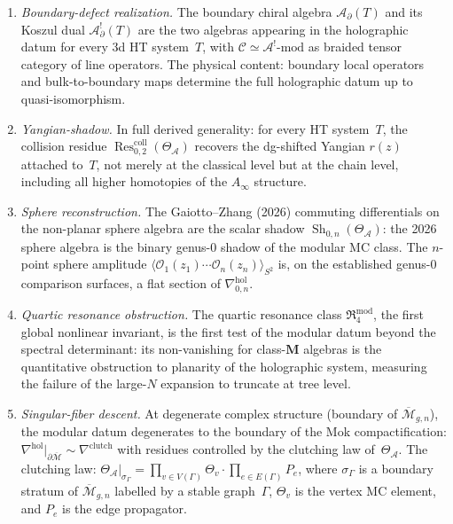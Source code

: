 \documentclass[11pt]{report}
\theoremstyle{definition}
\theoremstyle{remark}
\providecommand{\cA}{\mathcal{A}}
\providecommand{\cC}{\mathcal{C}}
\providecommand{\cM}{\mathcal{M}}
\providecommand{\cO}{\mathcal{O}}
\numberwithin{equation}{section}
\begin{document}
\begin{enumerate}[label=(\roman*)]
\item \emph{Boundary-defect realization.}
 The boundary chiral algebra $\cA_\partial(T)$ and its Koszul
 dual $\cA^!_\partial(T)$ are the two algebras appearing in the
 holographic datum for every 3d HT system~$T$, with
 $\cC\simeq\cA^!\text{-mod}$ as braided tensor category of line
 operators. The physical content: boundary local operators and
 bulk-to-boundary maps determine the full holographic datum up
 to quasi-isomorphism.

\item \emph{Yangian-shadow.}
 In full derived generality: for every HT system~$T$, the
 collision residue
 $\operatorname{Res}^{\mathrm{coll}}_{0,2}(\Theta_\cA)$ recovers
 the dg-shifted Yangian $r(z)$ attached to~$T$, not merely at
 the classical level but at the chain level, including all
 higher homotopies of the $A_\infty$ structure.

\item \emph{Sphere reconstruction.}
 The Gaiotto--Zhang (2026) commuting differentials on the
 non-planar sphere algebra are the scalar shadow
 $\operatorname{Sh}_{0,n}(\Theta_\cA)$: the 2026 sphere algebra
 is the binary genus-$0$ shadow of the modular MC class. The
 $n$-point sphere amplitude
 $\langle\cO_1(z_1)\cdots\cO_n(z_n)\rangle_{S^2}$ is, on the
 established genus-$0$ comparison surfaces, a flat section of
 $\nabla^{\mathrm{hol}}_{0,n}$.

\item \emph{Quartic resonance obstruction.}
 The quartic resonance class $\mathfrak R^{\mathrm{mod}}_4$, the
 first global nonlinear invariant, is
 the first test of the modular datum beyond the spectral
 determinant: its non-vanishing for class-$\mathbf{M}$ algebras
 is the quantitative obstruction to planarity of the holographic
 system, measuring the failure of the large-$N$ expansion to
 truncate at tree level.

\item \emph{Singular-fiber descent.}
 At degenerate complex structure (boundary of
 $\overline{\cM}_{g,n}$), the modular datum degenerates to the
 boundary of the Mok compactification:
 $\nabla^{\mathrm{hol}}|_{\partial\overline{\cM}}\sim
 \nabla^{\mathrm{clutch}}$ with residues controlled by the
 clutching law of~$\Theta_\cA$. The clutching law:
 $\Theta_\cA|_{\sigma_\Gamma}=\prod_{v\in V(\Gamma)}\Theta_v
 \cdot\prod_{e\in E(\Gamma)}P_e$, where $\sigma_\Gamma$
 is a boundary stratum of $\overline{\cM}_{g,n}$ labelled by
 a stable graph~$\Gamma$, $\Theta_v$ is the vertex MC element,
 and $P_e$ is the edge propagator.
\end{enumerate}
\end{document}
